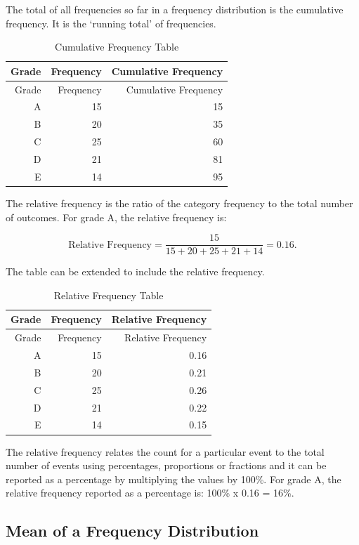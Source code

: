\documentclass[
]{book}
\begin{document}
The total of all frequencies so far in a frequency distribution is the cumulative frequency. It is the `running total' of frequencies.

\begin{longtable}[]{@{}rrr@{}}
\caption{\label{tab:table6}Cumulative Frequency Table}\tabularnewline
\toprule
Grade & Frequency & Cumulative Frequency \\
\midrule
\endfirsthead
\toprule
Grade & Frequency & Cumulative Frequency \\
\midrule
\endhead
A & 15 & 15 \\
B & 20 & 35 \\
C & 25 & 60 \\
D & 21 & 81 \\
E & 14 & 95 \\
\bottomrule
\end{longtable}

The relative frequency is the ratio of the category frequency to the total number of outcomes. For grade A, the relative frequency is:

\[ \textrm{Relative Frequency}=\frac{15}{15+20+25+21+14}=0.16. \]

The table can be extended to include the relative frequency.

\begin{longtable}[]{@{}rrr@{}}
\caption{\label{tab:table7}Relative Frequency Table}\tabularnewline
\toprule
Grade & Frequency & Relative Frequency \\
\midrule
\endfirsthead
\toprule
Grade & Frequency & Relative Frequency \\
\midrule
\endhead
A & 15 & 0.16 \\
B & 20 & 0.21 \\
C & 25 & 0.26 \\
D & 21 & 0.22 \\
E & 14 & 0.15 \\
\bottomrule
\end{longtable}

The relative frequency relates the count for a particular event to the total number of events using percentages, proportions or fractions and it can be reported as a percentage by multiplying the values by 100\%. For grade A, the relative frequency reported as a percentage is: 100\% x 0.16 = 16\%.

\hypertarget{mean-of-a-frequency-distribution}{%
\subsection{Mean of a Frequency Distribution}\label{mean-of-a-frequency-distribution}}
\end{document}
